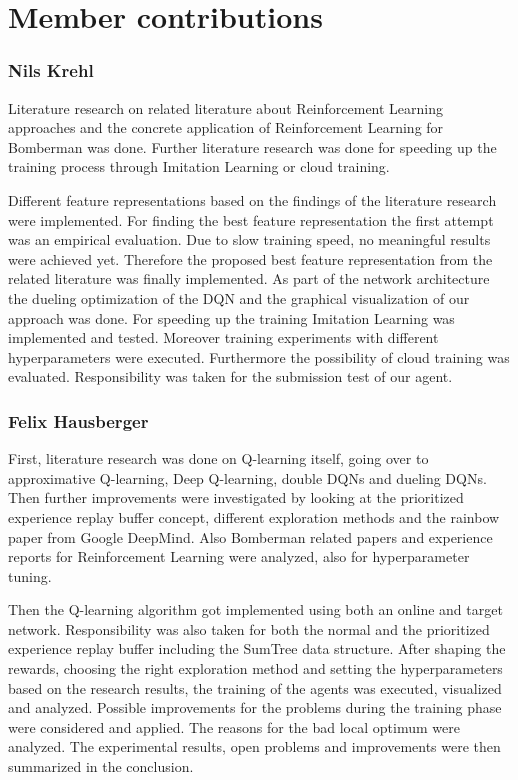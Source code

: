 \section*{Member contributions}

\subsubsection*{Nils Krehl}

Literature research on related literature about Reinforcement Learning approaches and the concrete application of Reinforcement Learning for Bomberman was done. Further literature research was done for speeding up the training process through Imitation Learning or cloud training.

Different feature representations based on the findings of the literature research were implemented. For finding the best feature representation the first attempt was an empirical evaluation. Due to slow training speed, no meaningful results were achieved yet. Therefore the proposed best feature representation from the related literature was finally implemented.
As part of the network architecture the dueling optimization of the DQN and the graphical visualization of our approach was done.
For speeding up the training Imitation Learning was implemented and tested.
Moreover training experiments with different hyperparameters were executed.
Furthermore the possibility of cloud training was evaluated.
Responsibility was taken for the submission test of our agent.

\subsubsection*{Felix Hausberger}

First, literature research was done on Q-learning itself, going over to approximative Q-learning, Deep Q-learning, double DQNs and dueling DQNs. Then further improvements were investigated by looking at the prioritized experience replay buffer concept, different exploration methods and the rainbow paper from Google DeepMind. Also Bomberman related papers and experience reports for Reinforcement Learning were analyzed, also for hyperparameter tuning. 

Then the Q-learning algorithm got implemented using both an online and target network. Responsibility was also taken for both the normal and the prioritized experience replay buffer including the SumTree data structure. After shaping the rewards, choosing the right exploration method and setting the hyperparameters based on the research results, the training of the agents was executed, visualized and analyzed. Possible improvements for the problems during the training phase were considered and applied. The reasons for the bad local optimum were analyzed. The experimental results, open problems and improvements were then summarized in the conclusion.
